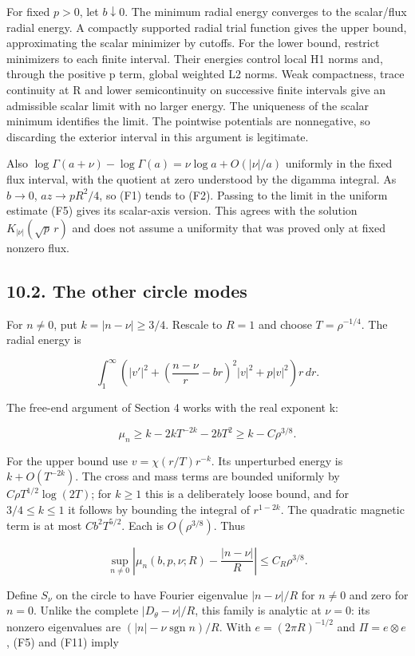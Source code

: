 \documentclass[11pt]{article}
\begin{document}
For fixed \(p>0\), let \(b\downarrow0\). The minimum radial energy
converges to the scalar/flux radial energy. A compactly supported radial
trial function gives the upper bound, approximating the scalar minimizer
by cutoffs. For the lower bound, restrict minimizers to each finite
interval. Their energies control local H1 norms and, through the
positive p term, global weighted L2 norms. Weak compactness, trace
continuity at R and lower semicontinuity on successive finite intervals
give an admissible scalar limit with no larger energy. The uniqueness of
the scalar minimum identifies the limit. The pointwise potentials are
nonnegative, so discarding the exterior interval in this argument is
legitimate.

Also \(\log\Gamma(a+\nu)-\log\Gamma(a)=\nu\log a+O(|\nu|/a)\) uniformly
in the fixed flux interval, with the quotient at zero understood by the
digamma integral. As \(b\to0\), \(az\to pR^2/4\), so (F1) tends to (F2).
Passing to the limit in the uniform estimate (F5) gives its scalar-axis
version. This agrees with the solution \(K_{|\nu|}(\sqrt p\,r)\) and
does not assume a uniformity that was proved only at fixed nonzero flux.

\subsection{10.2. The other circle modes}\label{the-other-circle-modes}

For \(n\neq0\), put \(k=|n-\nu|\geq3/4\). Rescale to \(R=1\) and choose
\(T=\rho^{-1/4}\). The radial energy is

\[\int_1^\infty\left(|v'|^2+\left(\frac{n-\nu}r-br\right)^2|v|^2+p|v|^2\right)r\,dr.\]

The free-end argument of Section 4 works with the real exponent k:

\[\mu_n\geq k-2kT^{-2k}-2bT^2\geq k-C\rho^{3/8}.\]

For the upper bound use \(v=\chi(r/T)r^{-k}\). Its unperturbed energy is
\(k+O(T^{-2k})\). The cross and mass terms are bounded uniformly by
\(C\rho T^{1/2}\log(2T)\); for \(k\geq1\) this is a deliberately loose
bound, and for \(3/4\leq k\leq1\) it follows by bounding the integral of
\(r^{1-2k}\). The quadratic magnetic term is at most \(Cb^2T^{5/2}\).
Each is \(O(\rho^{3/8})\). Thus

\[\sup_{n\neq0}\left|\mu_n(b,p,\nu;R)-\frac{|n-\nu|}{R}\right|\leq C_R\rho^{3/8}.\tag{F11}\]

Define \(S_\nu\) on the circle to have Fourier eigenvalue \(|n-\nu|/R\)
for \(n\neq0\) and zero for \(n=0\). Unlike the complete
\(|D_\theta-\nu|/R\), this family is analytic at \(\nu=0\): its nonzero
eigenvalues are \((|n|-\nu\operatorname{sgn}n)/R\). With
\(e=(2\pi R)^{-1/2}\) and \(\Pi=e\otimes e\), (F5) and (F11) imply
\end{document}
